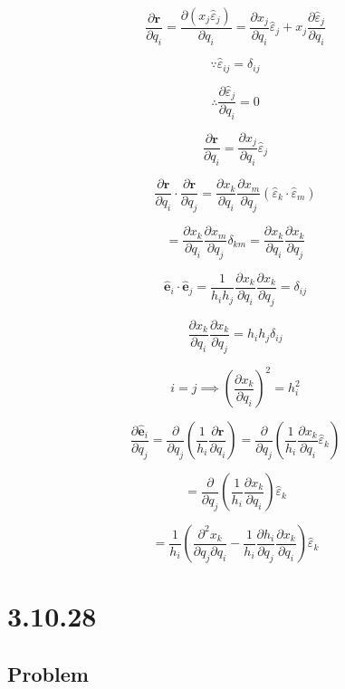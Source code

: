 \documentclass[12pt]{article}
\begin{document}
\[
    \frac{\partial \textbf{r}}{\partial q_i} = \frac{\partial (x_j \hat{\varepsilon}_j)}{\partial q_i}
    = \frac{\partial x_j}{\partial q_i} \hat{\varepsilon}_j + x_j \frac{\partial \hat{\varepsilon}_j}{\partial q_i}
\]

\[
    \because  \hat{\varepsilon}_{ij} = \delta_{ij}
\]

\[
    \therefore \frac{\partial \hat{\varepsilon}_j}{\partial q_i} = 0
\]

\[
    \frac{\partial \textbf{r}}{\partial q_i} = \frac{\partial x_j}{\partial q_i} \hat{\varepsilon}_j
\]

\[
    \frac{\partial \textbf{r}}{\partial q_i} \cdot \frac{\partial \textbf{r}}{\partial q_j}
    = \frac{\partial x_k}{\partial q_i} \frac{\partial x_m}{\partial q_j}
    \left(\hat{\varepsilon}_k \cdot \hat{\varepsilon}_m\right)
\]

\[
    = \frac{\partial x_k}{\partial q_i} \frac{\partial x_m}{\partial q_j} \delta_{km}
    = \frac{\partial x_k}{\partial q_i} \frac{\partial x_k}{\partial q_j}
\]

\[
    \hat{\textbf{e}}_i \cdot \hat{\textbf{e}}_j
    = \frac{1}{h_i h_j} \frac{\partial x_k}{\partial q_i} \frac{\partial x_k}{\partial q_j} = \delta_{ij}
\]

\[
    \frac{\partial x_k}{\partial q_i} \frac{\partial x_k}{\partial q_j} = h_i h_j \delta_{ij}
\]

\[
    i = j \implies {\left(\frac{\partial x_k}{\partial q_i}\right)}^2 = h_i^2
\]

\[
    \frac{\partial \hat{\textbf{e}}_i}{\partial q_j} = \frac{\partial}{\partial q_j}
    \left(\frac{1}{h_i} \frac{\partial \textbf{r}}{\partial q_i}\right)
    = \frac{\partial}{\partial q_j}
    \left(\frac{1}{h_i} \frac{\partial x_k}{\partial q_i} \hat{\varepsilon}_k\right)
\]

\[
    = \frac{\partial}{\partial q_j} \left(\frac{1}{h_i} \frac{\partial x_k}{\partial q_i}\right)
    \hat{\varepsilon}_k
\]

\[
    = \frac{1}{h_i}
    \left(
    \frac{\partial^2 x_k}{\partial q_j \partial q_i}
    - \frac{1}{h_i} \frac{\partial h_i}{\partial q_j} \frac{\partial x_k}{\partial q_i}
    \right) \hat{\varepsilon}_k
\] %

\section{3.10.28}\label{3.10.28}

\subsection{Problem}
\end{document}
